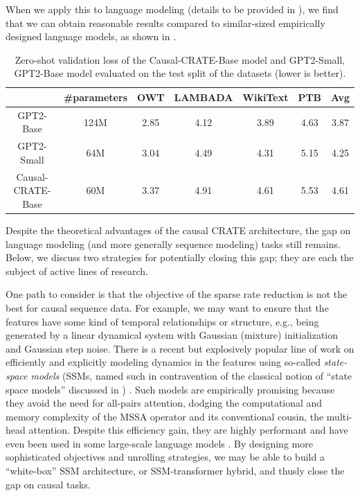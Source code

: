 \documentclass[../../book-main.tex]{subfiles}
\begin{document}
When we apply this to language modeling (details to be provided in ), we find that we can obtain reasonable results compared to similar-sized empirically designed language models, as shown in .

\begin{table}[t!]
        \small
        \caption{\small Zero-shot validation loss of the Causal-CRATE-Base model and GPT2-Small, GPT2-Base model evaluated on the test split of the datasets (lower is better). 
        }
        \centering
        \begin{tabular}{ccccccc}
        \hline
        & \#parameters & \textbf{OWT} & \textbf{LAMBADA} & \textbf{WikiText} & \textbf{PTB} & \textbf{Avg} \\
         \hline
         GPT2-Base  & {124M} & 2.85 & 4.12 & 3.89 & 4.63 & 3.87 \\
         {GPT2-Small } &  {64M} & {3.04} & {4.49} & {4.31} & {5.15} & {4.25} \\
         Causal-CRATE-Base & {60M} & 3.37 & 4.91 & 4.61 & 5.53 & 4.61 \\
         \hline
        \end{tabular}
        \label{tab:causal-crate-results}
\end{table}

Despite the theoretical advantages of the causal CRATE architecture, the gap on language modeling (and more generally sequence modeling) tasks still remains. Below, we discuss two strategies for potentially closing this gap; they are each the subject of active lines of research.

\begin{example}
    One path to consider is that the objective of the sparse rate reduction is not the best for causal sequence data. For example, we may want to ensure that the features have some kind of temporal relationships or structure, e.g., being generated by a linear dynamical system with Gaussian (mixture) initialization and Gaussian step noise. There is a recent but explosively popular line of work on efficiently and explicitly modeling dynamics in the features using so-called \textit{state-space models} (SSMs, named such in contravention of the classical notion of ``state space models'' discussed in ) \citep{gu2024mamba,yang2024parallelizing,yang2024gated}. Such models are empirically promising because they avoid the need for all-pairs attention, dodging the computational and memory complexity of the MSSA operator and its conventional cousin, the multi-head attention. Despite this efficiency gain, they are highly performant and have even been used in some large-scale language models \citep{team2025kimi}. By designing more sophisticated objectives and unrolling strategies, we may be able to build a ``white-box'' SSM architecture, or SSM-transformer hybrid, and thusly close the gap on causal tasks.
\end{example}
\end{document}

